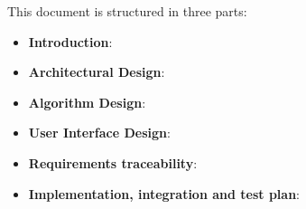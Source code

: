 This document is structured in three parts:
\begin{itemize}
	\item \textbf{Introduction}: 
	\item \textbf{Architectural Design}: 
	\item \textbf{Algorithm Design}: 
	\item \textbf{User Interface Design}: 
	\item \textbf{Requirements traceability}: 
	\item \textbf{Implementation, integration and test plan}: 
\end{itemize}